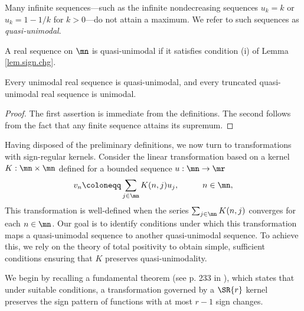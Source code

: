 \documentclass[11pt]{article}
\begin{document}
Many infinite sequences---such as the infinite nondecreasing sequences $u_k=k$  or $u_k = 1-1/k$ for $k > 0$---do not attain a maximum. We refer to such sequences as \textit{quasi-unimodal}.
\begin{define}
A real sequence  on $\mn$ is quasi-unimodal if it satisfies condition \rm(i)  of Lemma \ref{lem.sign.chg}.
\end{define}
\begin{lemma}
Every  unimodal real sequence is quasi-unimodal, and every truncated  quasi-unimodal real sequence is unimodal.
\end{lemma}
\begin{proof}
The first assertion is immediate from the definitions. The second follows from the fact that any finite sequence attains its supremum. 
\end{proof}

Having disposed of the preliminary definitions, we now turn to transformations with sign-regular kernels. 	Consider the  linear transformation based on a kernel  $K: \mn \times \mn $ defined for a bounded sequence  $u:\mn\to \mr$
	\begin{alignat}{2}
		v_n &\coloneqq  \sum_{j \in \mn} K(n,j)u_j,\qquad &n \in \mn \label{def.kernel.sequence-sequence},
	\end{alignat}
	This transformation is well-defined when the series $\sum_{j \in \mn} K(n, j)$ converges  for each $n \in \mn$. Our goal is to identify conditions under which this transformation maps a quasi-unimodal sequence to another quasi-unimodal sequence. To achieve this, we rely on the theory  of total positivity to obtain simple, sufficient conditions ensuring that $K$ preserves quasi-unimodality. 	  
	
	
	We begin by recalling a  fundamental theorem (see p. 233 in \cite{KarlinTPBook}), which states that under suitable conditions, a transformation governed by a $\SR{r}$ kernel preserves the sign pattern of functions with at most $r-1$ sign changes.
	
\end{document}
